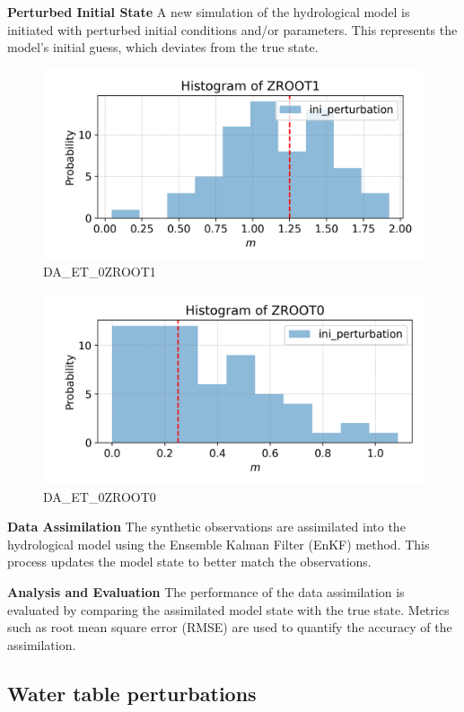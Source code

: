 \documentclass{article}
\begin{document}
\textbf{Perturbed Initial State}
A new simulation of the hydrological model is initiated with perturbed initial conditions and/or parameters. This represents the model's initial guess, which deviates from the true state.

\begin{figure}[!htbp]
\centering
\includegraphics[width=0.75\linewidth]{files/DA_ET_0ZROOT1-5513eabe5380a9280afae0dfbaa2f6e2.png}
\caption[]{DA\_ET\_0ZROOT1}
\label{DA_ET_0ZROOT1}
\end{figure}

\begin{figure}[!htbp]
\centering
\includegraphics[width=0.75\linewidth]{files/DA_ET_0ZROOT0-17556b113c91aeb53d1c9e920273c790.png}
\caption[]{DA\_ET\_0ZROOT0}
\label{DA_ET_0ZROOT0}
\end{figure}

\textbf{Data Assimilation}
The synthetic observations are assimilated into the hydrological model using the Ensemble Kalman Filter (EnKF) method. This process updates the model state to better match the observations.

\textbf{Analysis and Evaluation}
The performance of the data assimilation is evaluated by comparing the assimilated model state with the true state. Metrics such as root mean square error (RMSE) are used to quantify the accuracy of the assimilation.

\subsection{Water table perturbations}
\end{document}

